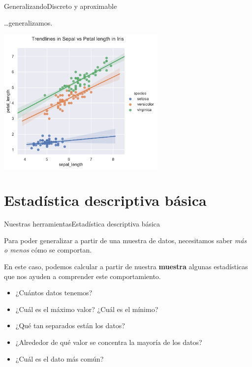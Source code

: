 \documentclass[spanish, c]{beamer}
\begin{document}
\begin{frame}{Generalizando}{Discreto y aproximable}

    \dots generalizamos.

    \begin{center}
        \includegraphics[width=0.62\textwidth]{regplot.pdf}
    \end{center}
    
\end{frame}

\section{Estadística descriptiva básica}

\begin{frame}{Nuestras herramientas}{Estadística descriptiva básica}

Para poder generalizar a partir de una \alert{muestra} de datos, necesitamos saber \textit{más o menos} cómo se comportan. \pause

\bigskip

En este caso, podemos calcular a partir de nuestra \textbf{muestra} algunas \alert{estadísticas} que nos ayuden a comprender este comportamiento. \pause

\begin{itemize}[<+->]
    \item ¿Cuántos datos tenemos?
    \item ¿Cuál es el máximo valor? ¿Cuál es el mínimo?
    \item ¿Qué tan separados están los datos?
    \item ¿Alrededor de qué valor se concentra la mayoría de los datos?
    \item ¿Cuál es el dato más común?
\end{itemize}
\end{frame}
\end{document}
